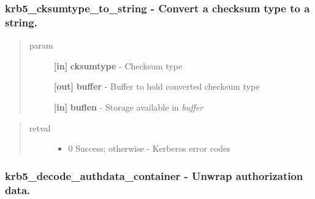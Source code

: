 \documentclass[letterpaper,10pt,english]{sphinxmanual}
\begin{document}
\subsubsection{krb5\_cksumtype\_to\_string -  Convert a checksum type to a string.}
\label{appdev/refs/api/krb5_cksumtype_to_string::doc}\label{appdev/refs/api/krb5_cksumtype_to_string:krb5-cksumtype-to-string-convert-a-checksum-type-to-a-string}

\begin{fulllineitems}
\label{appdev/refs/api/krb5_cksumtype_to_string:c.krb5_cksumtype_to_string}
\end{fulllineitems}

\begin{quote}\begin{description}
\item[{param}] \leavevmode
\textbf{{[}in{]}} \textbf{cksumtype} - Checksum type

\textbf{{[}out{]}} \textbf{buffer} - Buffer to hold converted checksum type

\textbf{{[}in{]}} \textbf{buflen} - Storage available in \emph{buffer}

\end{description}\end{quote}
\begin{quote}\begin{description}
\item[{retval}] \leavevmode\begin{itemize}
\item {} 
0   Success; otherwise - Kerberos error codes

\end{itemize}

\end{description}\end{quote}


\subsubsection{krb5\_decode\_authdata\_container -  Unwrap authorization data.}
\label{appdev/refs/api/krb5_decode_authdata_container::doc}\label{appdev/refs/api/krb5_decode_authdata_container:krb5-decode-authdata-container-unwrap-authorization-data}
\end{document}
